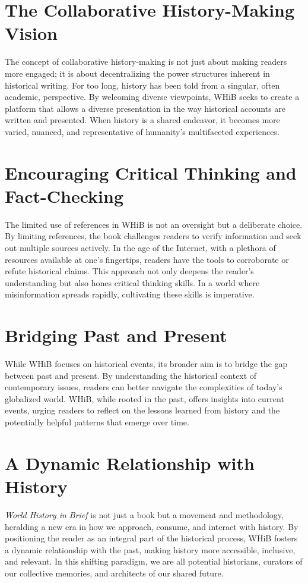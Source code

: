 \documentclass{book}
\begin{document}
\section*{The Collaborative History-Making Vision}
The concept of collaborative history-making is not just about making readers more engaged; it is about decentralizing the power structures inherent in historical writing. For too long, history has been told from a singular, often academic, perspective. By welcoming diverse viewpoints, WHiB seeks to create a platform that allows a diverse presentation in the way historical accounts are written and presented. When history is a shared endeavor, it becomes more varied, nuanced, and representative of humanity's multifaceted experiences.

\section*{Encouraging Critical Thinking and Fact-Checking}
The limited use of references in WHiB is not an oversight but a deliberate choice. By limiting references, the book challenges readers to verify information and seek out multiple sources actively. In the age of the Internet, with a plethora of resources available at one's fingertips, readers have the tools to corroborate or refute historical claims. This approach not only deepens the reader's understanding but also hones critical thinking skills. In a world where misinformation spreads rapidly, cultivating these skills is imperative.

\section*{Bridging Past and Present}
While WHiB focuses on historical events, its broader aim is to bridge the gap between past and present. By understanding the historical context of contemporary issues, readers can better navigate the complexities of today's globalized world. WHiB, while rooted in the past, offers insights into current events, urging readers to reflect on the lessons learned from history and the potentially helpful patterns that emerge over time.

\section*{A Dynamic Relationship with History}
\emph{World History in Brief} is not just a book but a movement and methodology, heralding a new era in how we approach, consume, and interact with history. By positioning the reader as an integral part of the historical process, WHiB fosters a dynamic relationship with the past, making history more accessible, inclusive, and relevant. In this shifting paradigm, we are all potential historians, curators of our collective memories, and architects of our shared future.
\end{document}
